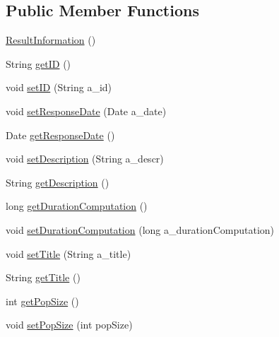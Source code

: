 \subsection*{Public Member Functions}
\begin{DoxyCompactItemize}
\item 
\hyperlink{classorg_1_1jgap_1_1distr_1_1grid_1_1wan_1_1_result_information_a475d12e77e70c82cce588ac60fa0bcab}{Result\-Information} ()
\item 
String \hyperlink{classorg_1_1jgap_1_1distr_1_1grid_1_1wan_1_1_result_information_a6098b19f3a3b6355ad64dfd9108a9874}{get\-I\-D} ()
\item 
void \hyperlink{classorg_1_1jgap_1_1distr_1_1grid_1_1wan_1_1_result_information_a132370e11d1550adb50e6fc7b134287c}{set\-I\-D} (String a\-\_\-id)
\item 
void \hyperlink{classorg_1_1jgap_1_1distr_1_1grid_1_1wan_1_1_result_information_a1e5bf5a46ce4ae2975a5862017f0daa3}{set\-Response\-Date} (Date a\-\_\-date)
\item 
Date \hyperlink{classorg_1_1jgap_1_1distr_1_1grid_1_1wan_1_1_result_information_abb822caf7897ae4056bf22149c3d82cf}{get\-Response\-Date} ()
\item 
void \hyperlink{classorg_1_1jgap_1_1distr_1_1grid_1_1wan_1_1_result_information_ac0579f4c3c183b02fb7f43804556f3b4}{set\-Description} (String a\-\_\-descr)
\item 
String \hyperlink{classorg_1_1jgap_1_1distr_1_1grid_1_1wan_1_1_result_information_a80a683e17b1786eaaf2d6d1678b60dc1}{get\-Description} ()
\item 
long \hyperlink{classorg_1_1jgap_1_1distr_1_1grid_1_1wan_1_1_result_information_aff48492af95ed44f81ba82dfbb1f5f92}{get\-Duration\-Computation} ()
\item 
void \hyperlink{classorg_1_1jgap_1_1distr_1_1grid_1_1wan_1_1_result_information_af8b898ffd01aa95c56f9ced06ddf9de0}{set\-Duration\-Computation} (long a\-\_\-duration\-Computation)
\item 
void \hyperlink{classorg_1_1jgap_1_1distr_1_1grid_1_1wan_1_1_result_information_a42326a7834241e5ac789aa9a7b6ff43f}{set\-Title} (String a\-\_\-title)
\item 
String \hyperlink{classorg_1_1jgap_1_1distr_1_1grid_1_1wan_1_1_result_information_a4d625b9df9e8515f5286386dea600282}{get\-Title} ()
\item 
int \hyperlink{classorg_1_1jgap_1_1distr_1_1grid_1_1wan_1_1_result_information_adbc332c465a0998d3d17b85526a43bf2}{get\-Pop\-Size} ()
\item 
void \hyperlink{classorg_1_1jgap_1_1distr_1_1grid_1_1wan_1_1_result_information_ae5ade065ba86f84de283fc86b34f2ced}{set\-Pop\-Size} (int pop\-Size)
\end{DoxyCompactItemize}
